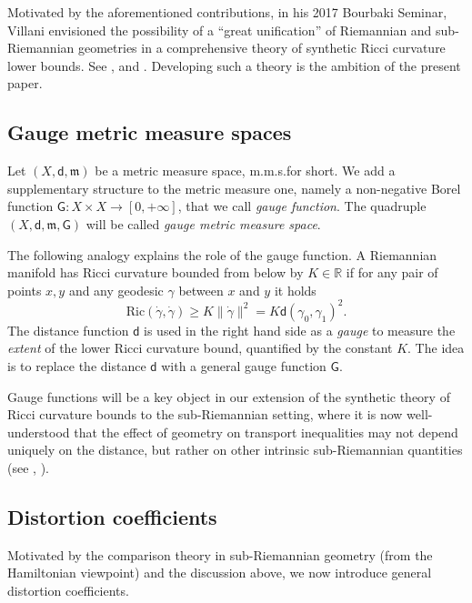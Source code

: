 \documentclass[11pt,a4paper]{article}
\theoremstyle{plain}
\theoremstyle{definition}
\theoremstyle{remark}
\numberwithin{equation}{section}
\newcommand{\R}{\mathbb{R}} %
\newcommand{\Ric}{\mathrm{Ric}}
\newcommand{\mm}{\mathfrak m}
\newcommand{\sfd}{\mathsf d}
\newcommand{\sfG}{\mathsf G}
\begin{document}
Motivated by the aforementioned contributions, in his 2017 Bourbaki Seminar, Villani envisioned the possibility of a ``great unification'' of Riemannian  and sub-Riemannian geometries in a comprehensive theory of synthetic Ricci curvature lower bounds. See \cite[Sec.\@ 9, conclusions et perspectives]{CVNB}, and \cite[Rmk.\@ 14.23]{Vil}. Developing such a theory is the ambition of the present paper.



\subsection*{Gauge metric measure spaces}
Let  $(X,\sfd,\mm)$ be a metric measure space, m.m.s.\@ for short. We add a supplementary structure to the metric measure one, namely a non-negative Borel function $\sfG: X\times X\to [0,+\infty]$, that we call   \emph{gauge function}.
The quadruple  $(X,\sfd,\mm,\sfG)$ will be called \emph{gauge metric measure space}. 

The following analogy explains the role of the gauge function. A Riemannian manifold has Ricci curvature bounded from below by $K \in \R$ if for any pair of points $x,y$ and any geodesic $\gamma$ between $x$ and $y$ it holds
\begin{equation}
\Ric(\dot\gamma,\dot\gamma) \geq K \|\dot\gamma\|^2 = K  \sfd(\gamma_0,\gamma_1)^2.
\end{equation}
The distance function $\sfd$ is used in the right hand side as a \emph{gauge} to measure the \emph{extent} of the lower Ricci curvature bound, quantified by the constant $K$. The idea is to replace the distance $\sfd$ with a general gauge function $\sfG$.  

Gauge functions will be a key object in our extension of the synthetic theory of Ricci curvature bounds to the sub-Riemannian setting, where it is now well-understood that the effect of geometry on transport inequalities may not depend uniquely on the distance, but rather on other intrinsic sub-Riemannian quantities  (see \cite{BKS}, \cite[Sec.\@ 8.1]{BRInv}).



\subsection*{Distortion coefficients}
 Motivated by the comparison theory in sub-Riemannian geometry  \cite{AG1, AG2, ZeLi,  ZeLi2,  HughenPhD, AAPL-Ricci, LeeLiZel-Sasakian, BR-comparison, BRMathAnn}  (from the Hamiltonian viewpoint) and the discussion above, we now introduce general distortion coefficients.
\end{document}
